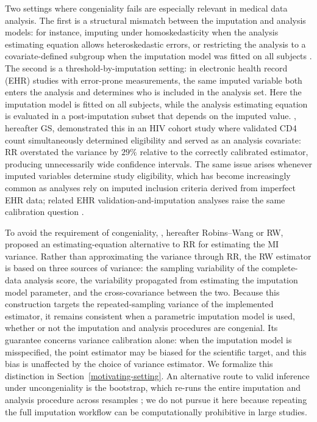 Two settings where congeniality fails are especially relevant in
medical data analysis.  The first is a structural mismatch between the
imputation and analysis models: for instance, imputing under
homoskedasticity when the analysis estimating equation allows
heteroskedastic errors, or restricting the analysis to a
covariate-defined subgroup when the imputation model was fitted on all
subjects \citep{bartlett2015substantive}.
The second is a threshold-by-imputation setting: in electronic health
record (EHR) studies with error-prone measurements, the same imputed
variable both enters the analysis and determines who is included in the
analysis set.  Here the imputation model is fitted on all subjects,
while the analysis estimating equation is evaluated in a
post-imputation subset that depends on the imputed value.
\citet{giganti2020multiple}, hereafter GS, demonstrated this in an HIV
cohort study where validated CD4 count simultaneously determined
eligibility and served as an analysis covariate: RR overstated the
variance by $29\%$ relative to the correctly calibrated estimator,
producing unnecessarily wide confidence intervals.  The same issue
arises whenever imputed variables determine study eligibility, which has
become increasingly common as analyses rely on imputed inclusion
criteria derived from imperfect EHR data; related EHR validation-and-imputation analyses raise the same calibration question
\citep{giganti2020dependent, shen2026missingness}.

To avoid the requirement of congeniality, \citet{robins2000inference},
hereafter Robins--Wang or RW, proposed an estimating-equation
alternative to RR for estimating the MI variance.  Rather than
approximating the variance through RR, the RW estimator is based on
three sources of variance: the sampling variability of the
complete-data analysis score, the variability propagated from
estimating the imputation model parameter, and the cross-covariance
between the two.  Because this construction targets the
repeated-sampling variance of the implemented estimator, it remains
consistent when a parametric imputation model is used, whether or not
the imputation and analysis procedures are congenial.  Its guarantee
concerns variance calibration alone: when the imputation model is
misspecified, the point estimator may be biased for the scientific
target, and this bias is unaffected by the choice of variance
estimator.  We formalize this distinction in
Section~\ref{motivating-setting}.  An alternative route to valid
inference under uncongeniality is the bootstrap, which re-runs the
entire imputation and analysis procedure across resamples
\citep{schomaker2018bootstrap, bartlett2020bootstrap}; we do not pursue
it here because repeating the full imputation workflow can be
computationally prohibitive in large studies.

